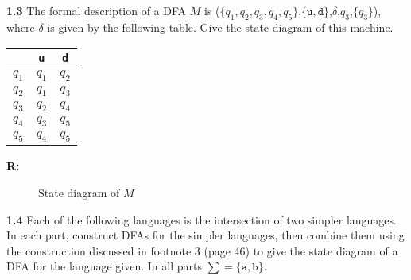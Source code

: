 \documentclass{article}
\begin{document}
\pagebreak
\textbf{1.3} The formal description of a DFA $M$ is
($\{q_1,q_2,q_3,q_4,q_5\}$,$\{\texttt{u},\texttt{d}\}$,$\delta$,$q_3$,$\{q_3\}$),
where $\delta$ is given by the following table. Give the state diagram of this
machine.

\begin{center}
\begin{tabular}{c|cc}
            &   \texttt{u}     &   \texttt{d} \\
    \hline
    $q_1$   &   $q_1$   &   $q_2$   \\
    $q_2$   &   $q_1$   &   $q_3$   \\
    $q_3$   &   $q_2$   &   $q_4$   \\
    $q_4$   &   $q_3$   &   $q_5$   \\
    $q_5$   &   $q_4$   &   $q_5$
\end{tabular}
\end{center}

\textbf{R: }
\begin{figure}[h!]
    \centering
    \caption{State diagram of $M$}
    \end{figure}

\textbf{1.4} Each of the following languages is the intersection of two simpler
languages. In each part, construct DFAs for the simpler languages, then combine
them using the construction discussed in footnote 3 (page 46) to give the state
diagram of a DFA for the language given. In all parts $\sum = \{\texttt{a},
\texttt{b}\}$.
\end{document}
